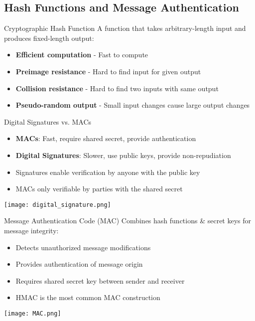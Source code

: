 \multend

\subsection{Hash Functions and Message Authentication}





\begin{minipage}{0.7\linewidth}

    \begin{definition}{Cryptographic Hash Function}
    A function that takes arbitrary-length input and produces fixed-length output:
    \begin{itemize}
        \item \textbf{Efficient computation} - Fast to compute
        \item \textbf{Preimage resistance} - Hard to find input for given output
        \item \textbf{Collision resistance} - Hard to find two inputs with same output
        \item \textbf{Pseudo-random output} - Small input changes cause large output changes
    \end{itemize}
\end{definition}

\begin{concept}{Digital Signatures vs. MACs}
    \begin{itemize}
        \item \textbf{MACs}: Fast, require shared secret, provide authentication
        \item \textbf{Digital Signatures}: Slower, use public keys, provide non-repudiation
        \item Signatures enable verification by anyone with the public key
        \item MACs only verifiable by parties with the shared secret
    \end{itemize}
\end{concept}
\end{minipage}
\begin{minipage}{0.3\linewidth}
    \texttt{[image: digital\_signature.png]}
\end{minipage}



\begin{definition}{Message Authentication Code (MAC)}
    Combines hash functions \& secret keys for message integrity:
    \begin{itemize}
        \item Detects unauthorized message modifications
        \item Provides authentication of message origin
        \item Requires shared secret key between sender and receiver
        \item HMAC is the most common MAC construction
    \end{itemize}
    \texttt{[image: MAC.png]}
\end{definition}

